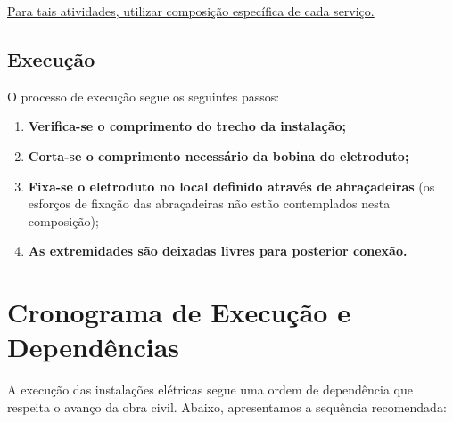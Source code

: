 \documentclass[12pt,a4paper]{article}
\begin{document}
\noindent\underline{Para tais atividades, utilizar composição específica de cada serviço.}

\subsection{Execução}

O processo de execução segue os seguintes passos:

\begin{enumerate}
\item \textbf{Verifica-se o comprimento do trecho da instalação;}
\item \textbf{Corta-se o comprimento necessário da bobina do eletroduto;}
\item \textbf{Fixa-se o eletroduto no local definido através de abraçadeiras} (os esforços de fixação das abraçadeiras não estão contemplados nesta composição);
\item \textbf{As extremidades são deixadas livres para posterior conexão.}
\end{enumerate}

\pagebreak

\section{Cronograma de Execução e Dependências}

A execução das instalações elétricas segue uma ordem de dependência que respeita o avanço da obra civil. Abaixo, apresentamos a sequência recomendada:
\end{document}
